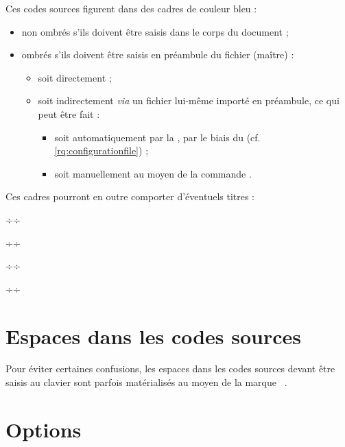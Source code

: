 Ces codes sources figurent dans des cadres de couleur bleu :
\begin{itemize}
\item non ombrés s'ils doivent être saisis dans le corps du document ;
\item ombrés s'ils doivent être saisis en préambule du fichier (maître) :
  \begin{itemize}
  \item soit directement ;
  \item soit indirectement \emph{via} un fichier lui-même importé en
    préambule, ce qui peut être fait :
    \begin{itemize}
    \item soit automatiquement par la \yatcl{}, par le biais du
      \File{\configurationfile} (cf. \vref{rq:configurationfile}) ;
    \item soit manuellement au moyen de la commande .
    \end{itemize}
  \end{itemize}
\end{itemize}
Ces cadres pourront en outre comporter d'éventuels titres :
\begin{multicols}{2}
\begin{bodycode}
÷÷
\end{bodycode}
\begin{bodycode}[title=\meta{titre}]
÷÷
\end{bodycode}
\begin{preamblecode}
÷÷
\end{preamblecode}
\begin{preamblecode}[title=\meta{titre}]
÷÷
\end{preamblecode}
\end{multicols}

\section{Espaces dans les codes sources}
\label{sec:espaces-dans-les}

Pour éviter certaines confusions, les espaces dans les codes sources devant
être saisis au clavier sont parfois matérialisés au moyen de la marque
\lstinline[showspaces]+ +.

\section{Options}
\label{sec:options}

